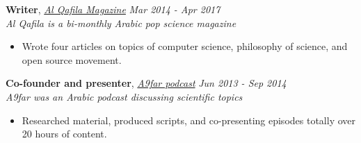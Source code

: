 \documentclass[margin]{res}
\begin{document}
\begin{resume}
    	\textbf{Writer}, \href{http://qafilah.com/ar/writers/\%D8\%A7\%D9\%84\%D8\%A8\%D8\%B1\%D8\%A7\%D8\%A1-\%D8\%B9\%D8\%B1\%D8\%A7\%D8\%A8\%D9\%8A/}{\textit{Al Qafila Magazine}}  \hfill \textit{Mar 2014 - Apr 2017} \\
    	\textit{Al Qafila is a bi-monthly Arabic pop science magazine}\\
    \vspace{-1em}
    \begin{itemize}[leftmargin=*]
	    \item Wrote four articles on topics of computer science, philosophy of science, and open source movement.
	\end{itemize}
    	
        
    	
    	\textbf{Co-founder and presenter}, \href{https://soundcloud.com/a9far/}{\textit{A9far podcast}}  \hfill \textit{Jun 2013 - Sep 2014} \\
    	\textit{A9far was an Arabic podcast discussing scientific topics}\\ 
    \vspace{-1em}
    \begin{itemize}[leftmargin=*]
	    \item Researched material, produced scripts, and co-presenting episodes totally over 20 hours of content.
	\end{itemize}
    	
    	
    	 

    	





\end{resume}
\end{document}
